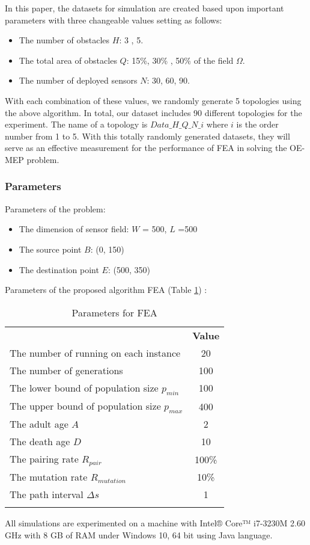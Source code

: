 \documentclass[final]{elsarticle}
\begin{document}
In this paper, the datasets for simulation are created based upon important parameters with three changeable values setting as follows:
\begin{itemize}
	\item The number of obstacles $H$: 3 , 5.
	\item The total area of obstacles $Q$: 15\%, 30\% , 50\% of the field $\Omega$.
	\item The number of deployed sensors $N$: 30, 60, 90.
\end{itemize}
With each combination of these values, we randomly generate 5 topologies using the above algorithm. In total, our dataset includes 90 different topologies for the experiment. The name of a topology is $Data\_H\_Q\_N\_i$ where $ i $ is the order number from 1 to 5. With this totally randomly generated datasets, they will serve as an effective measurement for the performance of FEA in solving the OE-MEP problem. 

\subsubsection{Parameters}
Parameters of the problem:
\begin{itemize}
	\item The dimension of sensor field: $ W $ = 500, $ L $ =500
	\item The source point $ B $: (0, 150) 
	\item The destination point $ E $: (500, 350)	
\end{itemize}
Parameters of the proposed algorithm FEA (Table \ref{tab1}) :
\begin{table}
	\caption{Parameters for FEA}
	\label{tab1}       %
	\begin{center}
		\renewcommand{\arraystretch}{1.5}
		\begin{tabular}{lc}
			\hline\noalign{\smallskip}
			\multicolumn{1}{c}{\textbf{Parameter}} & \textbf{Value} \\
			\noalign{\smallskip}\hline\noalign{\smallskip}
			The number of running on each instance & 20 \\
			The number of generations & 100\\
			The lower bound of population size $ p_{min} $ & 100\\
			The upper bound of population size $ p_{max} $ & 400\\
			The adult age $A$ & 2 \\
			The death age $D$ & 10 \\
			The pairing rate $ R_{pair}$  & 100\% \\
			The mutation rate $ R_{mutation} $ & 10\% \\
			The path interval $\Delta s$ & 1 \\ 
			\noalign{\smallskip} \hline
		\end{tabular}
	\end{center}
\end{table}
All simulations are experimented on a machine with Intel® Core™ i7-3230M 2.60 GHz with 8 GB of RAM under Windows 10, 64 bit using Java language.
\end{document}
